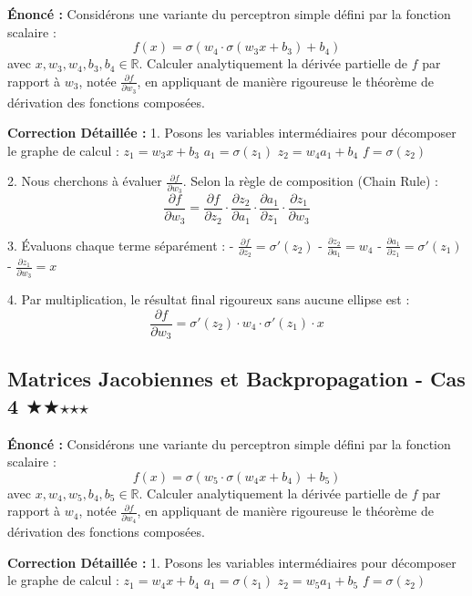 \documentclass[11pt,a4paper]{article}
\begin{document}
\textbf{Énoncé :}
Considérons une variante du perceptron simple défini par la fonction scalaire :
$$ f(x) = \sigma(w_{4} \cdot \sigma(w_{3} x + b_{3}) + b_{4}) $$
avec $x, w_{3}, w_{4}, b_{3}, b_{4} \in \mathbb{R}$.
Calculer analytiquement la dérivée partielle de $f$ par rapport à $w_{3}$, notée $\frac{{\partial f}}{{\partial w_{3}}}$, en appliquant de manière rigoureuse le théorème de dérivation des fonctions composées.

\textbf{Correction Détaillée :}
1. Posons les variables intermédiaires pour décomposer le graphe de calcul :
   $z_1 = w_{3} x + b_{3}$
   $a_1 = \sigma(z_1)$
   $z_2 = w_{4} a_1 + b_{4}$
   $f = \sigma(z_2)$

2. Nous cherchons à évaluer $\frac{{\partial f}}{{\partial w_{3}}}$. Selon la règle de composition (Chain Rule) :
   $$ \frac{{\partial f}}{{\partial w_{3}}} = \frac{{\partial f}}{{\partial z_2}} \cdot \frac{{\partial z_2}}{{\partial a_1}} \cdot \frac{{\partial a_1}}{{\partial z_1}} \cdot \frac{{\partial z_1}}{{\partial w_{3}}} $$

3. Évaluons chaque terme séparément :
   - $\frac{{\partial f}}{{\partial z_2}} = \sigma'(z_2)$
   - $\frac{{\partial z_2}}{{\partial a_1}} = w_{4}$
   - $\frac{{\partial a_1}}{{\partial z_1}} = \sigma'(z_1)$
   - $\frac{{\partial z_1}}{{\partial w_{3}}} = x$

4. Par multiplication, le résultat final rigoureux sans aucune ellipse est :
   $$ \frac{{\partial f}}{{\partial w_{3}}} = \sigma'(z_2) \cdot w_{4} \cdot \sigma'(z_1) \cdot x $$

\vspace{1cm}

\subsection*{Matrices Jacobiennes et Backpropagation - Cas 4 $\bigstar$$\bigstar$$\star$$\star$$\star$}

\textbf{Énoncé :}
Considérons une variante du perceptron simple défini par la fonction scalaire :
$$ f(x) = \sigma(w_{5} \cdot \sigma(w_{4} x + b_{4}) + b_{5}) $$
avec $x, w_{4}, w_{5}, b_{4}, b_{5} \in \mathbb{R}$.
Calculer analytiquement la dérivée partielle de $f$ par rapport à $w_{4}$, notée $\frac{{\partial f}}{{\partial w_{4}}}$, en appliquant de manière rigoureuse le théorème de dérivation des fonctions composées.

\textbf{Correction Détaillée :}
1. Posons les variables intermédiaires pour décomposer le graphe de calcul :
   $z_1 = w_{4} x + b_{4}$
   $a_1 = \sigma(z_1)$
   $z_2 = w_{5} a_1 + b_{5}$
   $f = \sigma(z_2)$
\end{document}
